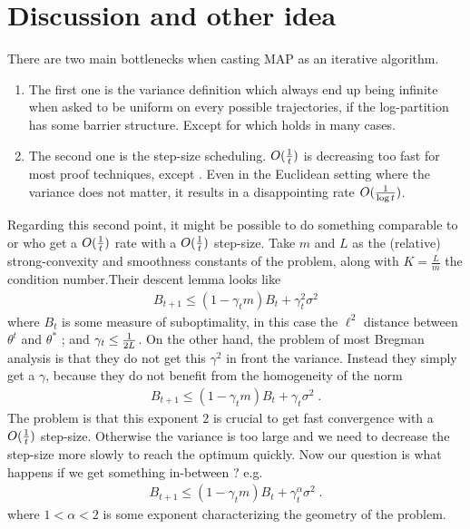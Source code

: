 \documentclass{article}
\newcommand{\natp}{\theta}
\newcommand{\lr}{\gamma} %
\begin{document}
\section{Discussion and other idea}
There are two main bottlenecks when casting MAP as an iterative algorithm. 
\begin{enumerate}
	\item The first one is the variance definition which always end up being infinite when asked to be uniform on every possible trajectories, if the log-partition  has some barrier structure. Except for \citet{dorazio2021stochastic} which holds in many cases.
	\item The second one is the step-size scheduling. $O(\frac{1}{t})$ is decreasing too fast for most proof techniques, except \citet{dragomir2021fast}. Even in the Euclidean setting where the variance does not matter, it results in a disappointing rate $O(\frac{1}{\log t})$.
\end{enumerate}
Regarding this second point, it might be possible to do something comparable to \citet{gower2019sgd} or \citet{dragomir2021fast} who get a $O(\frac{1}{t})$ rate with a $O(\frac{1}{t})$ step-size. Take $m$ and $L$ as the (relative) strong-convexity and smoothness constants of the problem, along with $K=\frac{L}{m}$ the condition number.Their descent lemma looks like
\begin{align}
	B_{t+1} \leq ( 1 - \lr_t m) B_t + \lr_t^2 \sigma^2
\end{align}
where $B_t$ is some measure of suboptimality, in this case the $\ell^2$ distance between $\natp^t$ and $\natp^*$ ; and $\lr_t \leq \inv{2L}$.
On the other hand, the problem of most Bregman analysis \citep{hanzely2018fastest,dorazio2021stochastic} is that they do not get this $\lr^2$ in front the variance. Instead they simply get a $\lr$, because they do not benefit from the homogeneity of the norm
\begin{align}
	B_{t+1} \leq ( 1 - \lr_t m) B_t + \lr_t \sigma^2 \; .
\end{align}
The problem is that this exponent $2$ is crucial to get fast convergence with a $O(\frac{1}{t})$ step-size. Otherwise the variance is too large and we need to decrease the step-size more slowly to reach the optimum quickly.
Now our question is what happens if we get something in-between ? e.g.
\begin{align}
	B_{t+1} \leq ( 1 - \lr_t m) B_t + \lr_t^\alpha \sigma^2 \; .
\end{align}
where $1<\alpha<2$ is some exponent characterizing the geometry of the problem.
\end{document}
